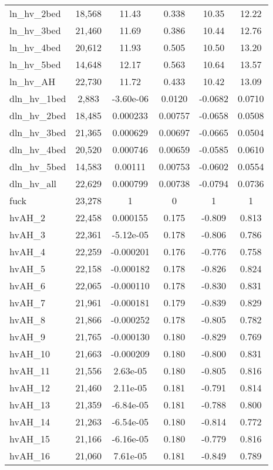 \begin{tabular}{lccccc}
ln\_hv\_2bed & 18,568 & 11.43 & 0.338 & 10.35 & 12.22 \\
ln\_hv\_3bed & 21,460 & 11.69 & 0.386 & 10.44 & 12.76 \\
ln\_hv\_4bed & 20,612 & 11.93 & 0.505 & 10.50 & 13.20 \\
ln\_hv\_5bed & 14,648 & 12.17 & 0.563 & 10.64 & 13.57 \\
ln\_hv\_AH & 22,730 & 11.72 & 0.433 & 10.42 & 13.09 \\
dln\_hv\_1bed & 2,883 & -3.60e-06 & 0.0120 & -0.0682 & 0.0710 \\
dln\_hv\_2bed & 18,485 & 0.000233 & 0.00757 & -0.0658 & 0.0508 \\
dln\_hv\_3bed & 21,365 & 0.000629 & 0.00697 & -0.0665 & 0.0504 \\
dln\_hv\_4bed & 20,520 & 0.000746 & 0.00659 & -0.0585 & 0.0610 \\
dln\_hv\_5bed & 14,583 & 0.00111 & 0.00753 & -0.0602 & 0.0554 \\
dln\_hv\_all & 22,629 & 0.000799 & 0.00738 & -0.0794 & 0.0736 \\
fuck & 23,278 & 1 & 0 & 1 & 1 \\
hvAH\_2 & 22,458 & 0.000155 & 0.175 & -0.809 & 0.813 \\
hvAH\_3 & 22,361 & -5.12e-05 & 0.178 & -0.806 & 0.786 \\
hvAH\_4 & 22,259 & -0.000201 & 0.176 & -0.776 & 0.758 \\
hvAH\_5 & 22,158 & -0.000182 & 0.178 & -0.826 & 0.824 \\
hvAH\_6 & 22,065 & -0.000110 & 0.178 & -0.830 & 0.831 \\
hvAH\_7 & 21,961 & -0.000181 & 0.179 & -0.839 & 0.829 \\
hvAH\_8 & 21,866 & -0.000252 & 0.178 & -0.805 & 0.782 \\
hvAH\_9 & 21,765 & -0.000130 & 0.180 & -0.829 & 0.769 \\
hvAH\_10 & 21,663 & -0.000209 & 0.180 & -0.800 & 0.831 \\
hvAH\_11 & 21,556 & 2.63e-05 & 0.180 & -0.805 & 0.816 \\
hvAH\_12 & 21,460 & 2.11e-05 & 0.181 & -0.791 & 0.814 \\
hvAH\_13 & 21,359 & -6.84e-05 & 0.181 & -0.788 & 0.800 \\
hvAH\_14 & 21,263 & -6.54e-05 & 0.180 & -0.814 & 0.772 \\
hvAH\_15 & 21,166 & -6.16e-05 & 0.180 & -0.779 & 0.816 \\
hvAH\_16 & 21,060 & 7.61e-05 & 0.181 & -0.849 & 0.789 \\

\end{tabular}
